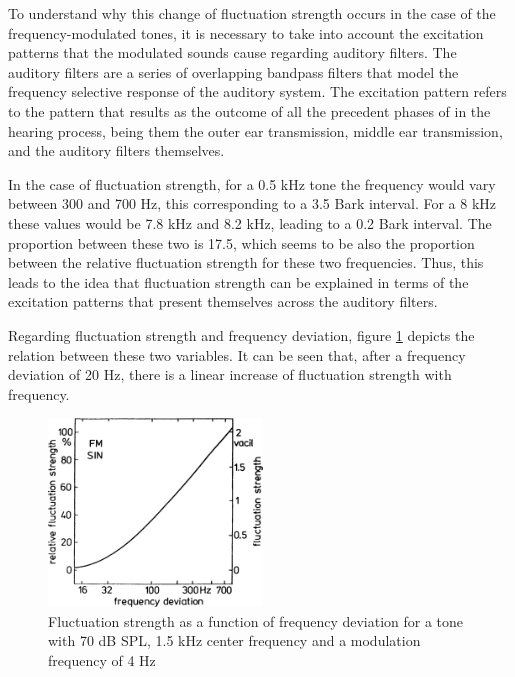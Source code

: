 To understand why this change of fluctuation strength occurs in the case of the
frequency-modulated tones, it is necessary to take into account the excitation
patterns that the modulated sounds cause regarding auditory filters. The
auditory filters are a series of overlapping bandpass filters that model the
frequency selective response of the auditory system. The excitation pattern
refers to the pattern that results as the outcome of all the precedent phases of
in the hearing process, being them the outer ear transmission, middle ear
transmission, and the auditory filters themselves.

In the case of fluctuation strength, for a 0.5 kHz tone the frequency would vary
between 300 and 700 Hz, this corresponding to a 3.5 Bark interval. For a 8 kHz
these values would be 7.8 kHz and 8.2 kHz, leading to a 0.2 Bark interval. The
proportion between these two is 17.5, which seems to be also the proportion
between the relative fluctuation strength for these two frequencies. Thus, this
leads to the idea that fluctuation strength can be explained in terms of the
excitation patterns that present themselves across the auditory filters.

Regarding fluctuation strength and frequency deviation, figure
\ref{fig:flucstrenvsfreqdev} depicts the relation between these two variables.
It can be seen that, after a frequency deviation of 20 Hz, there is a linear
increase of fluctuation strength with frequency.

\begin{figure}
    \centering
    \includegraphics[height=5cm]
        {img/FluctuationStrengthVsFrequencyDeviation}
    \caption{Fluctuation strength as a function of frequency deviation for a
        tone with 70 dB SPL, 1.5 kHz center frequency and a modulation frequency
        of 4 Hz \cite[pp. 251]{Fastl2007Psychoacoustics}}
    \label{fig:flucstrenvsfreqdev}
\end{figure}

